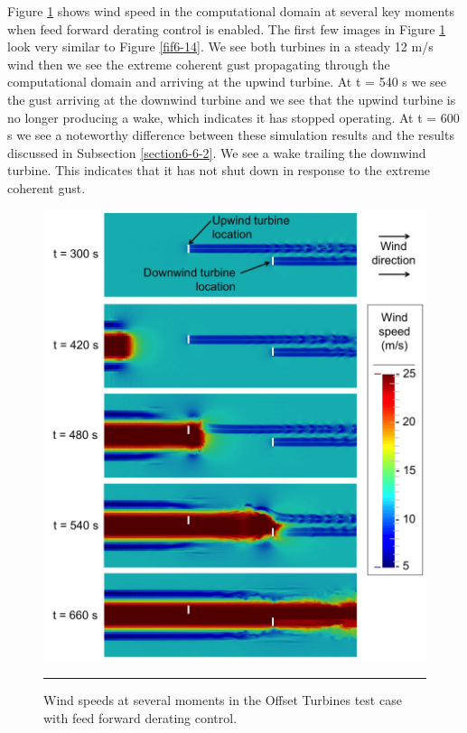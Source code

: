 Figure \ref{fig6-20} shows wind speed in the computational domain at several key moments when feed forward derating control is enabled. The first few images in Figure \ref{fig6-20} look very similar to Figure \ref{fif6-14}. We see both turbines in a steady 12 m/s wind then we see the extreme coherent gust propagating through the computational domain and arriving at the upwind turbine. At t = 540 s we see the gust arriving at the downwind turbine and we see that the upwind turbine is no longer producing a wake, which indicates it has stopped operating. At t = 600 s we see a noteworthy difference between these simulation results and the results discussed in Subsection \ref{section6-6-2}. We see a wake trailing the downwind turbine. This indicates that it has not shut down in response to the extreme coherent gust.

 \begin{figure}[htbp] \label{fig6-20} 
	\centering
		\includegraphics[width = \linewidth]{Figures/ch6Figures/fig6-20.png}
		\rule{35em}{0.5pt}
	\caption{Wind speeds at several moments in the Offset Turbines test case with feed forward derating control.}
\end{figure}


